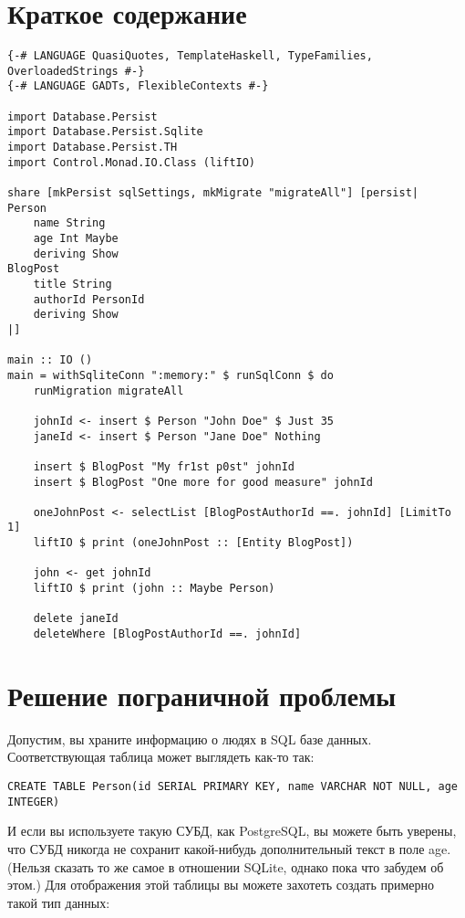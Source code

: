 \section{Краткое содержание} %

\begin{lstlisting}
{-# LANGUAGE QuasiQuotes, TemplateHaskell, TypeFamilies, OverloadedStrings #-}
{-# LANGUAGE GADTs, FlexibleContexts #-}

import Database.Persist
import Database.Persist.Sqlite
import Database.Persist.TH
import Control.Monad.IO.Class (liftIO)

share [mkPersist sqlSettings, mkMigrate "migrateAll"] [persist|
Person
    name String
    age Int Maybe
    deriving Show
BlogPost
    title String
    authorId PersonId
    deriving Show
|]

main :: IO ()
main = withSqliteConn ":memory:" $ runSqlConn $ do
    runMigration migrateAll

    johnId <- insert $ Person "John Doe" $ Just 35
    janeId <- insert $ Person "Jane Doe" Nothing

    insert $ BlogPost "My fr1st p0st" johnId
    insert $ BlogPost "One more for good measure" johnId

    oneJohnPost <- selectList [BlogPostAuthorId ==. johnId] [LimitTo 1]
    liftIO $ print (oneJohnPost :: [Entity BlogPost])

    john <- get johnId
    liftIO $ print (john :: Maybe Person)

    delete janeId
    deleteWhere [BlogPostAuthorId ==. johnId]
\end{lstlisting}%

\section{Решение пограничной проблемы} %

Допустим, вы храните информацию о людях в SQL базе данных. Соответствующая таблица может выглядеть как-то так:

\begin{lstlisting}
CREATE TABLE Person(id SERIAL PRIMARY KEY, name VARCHAR NOT NULL, age INTEGER)
\end{lstlisting}

И если вы используете такую СУБД, как PostgreSQL, вы можете быть уверены, что СУБД никогда не сохранит какой-нибудь дополнительный текст в поле age. (Нельзя сказать то же самое в отношении SQLite, однако пока что забудем об этом.) Для отображения этой таблицы вы можете захотеть создать примерно такой тип данных:

